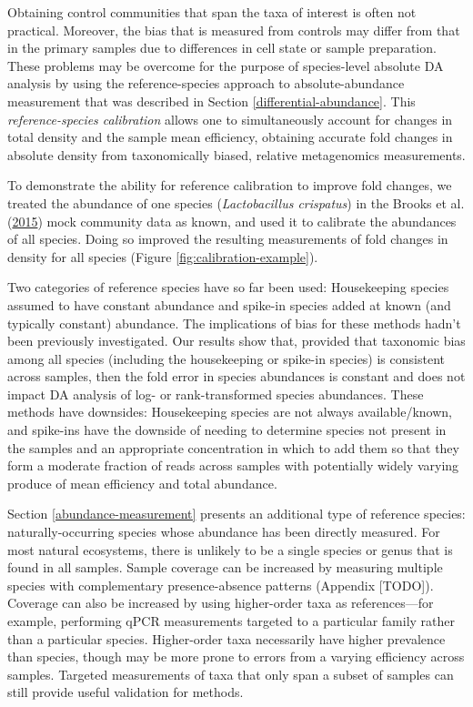 \documentclass[
]{article}
\begin{document}
Obtaining control communities that span the taxa of interest is often not practical.
Moreover, the bias that is measured from controls may differ from that in the primary samples due to differences in cell state or sample preparation.
These problems may be overcome for the purpose of species-level absolute DA analysis by using the reference-species approach to absolute-abundance measurement that was described in Section \ref{differential-abundance}.
This \emph{reference-species calibration} allows one to simultaneously account for changes in total density and the sample mean efficiency, obtaining accurate fold changes in absolute density from taxonomically biased, relative metagenomics measurements.

To demonstrate the ability for reference calibration to improve fold changes, we treated the abundance of one species (\emph{Lactobacillus crispatus}) in the Brooks et al. (\protect\hyperlink{ref-brooks2015thet}{2015}) mock community data as known, and used it to calibrate the abundances of all species.
Doing so improved the resulting measurements of fold changes in density for all species (Figure \ref{fig:calibration-example}).

Two categories of reference species have so far been used: Housekeeping species assumed to have constant abundance and spike-in species added at known (and typically constant) abundance.
The implications of bias for these methods hadn't been previously investigated.
Our results show that, provided that taxonomic bias among all species (including the housekeeping or spike-in species) is consistent across samples, then the fold error in species abundances is constant and does not impact DA analysis of log- or rank-transformed species abundances.
These methods have downsides: Housekeeping species are not always available/known, and spike-ins have the downside of needing to determine species not present in the samples and an appropriate concentration in which to add them so that they form a moderate fraction of reads across samples with potentially widely varying produce of mean efficiency and total abundance.

Section \ref{abundance-measurement} presents an additional type of reference species: naturally-occurring species whose abundance has been directly measured.
For most natural ecosystems, there is unlikely to be a single species or genus that is found in all samples.
Sample coverage can be increased by measuring multiple species with complementary presence-absence patterns (Appendix {[}TODO{]}).
Coverage can also be increased by using higher-order taxa as references---for example, performing qPCR measurements targeted to a particular family rather than a particular species.
Higher-order taxa necessarily have higher prevalence than species, though may be more prone to errors from a varying efficiency across samples.
Targeted measurements of taxa that only span a subset of samples can still provide useful validation for methods.
\end{document}
